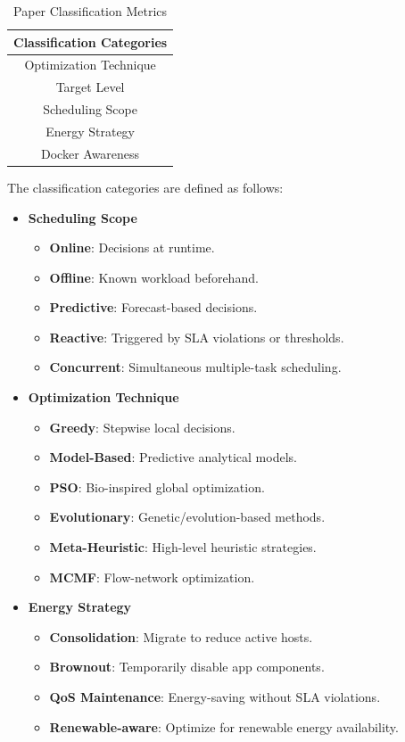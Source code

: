 \begin{multicols}{2}
\begin{table}[H]
\centering
\begin{tabular}{c}
\hline
Classification Categories\\ \hline
Optimization Technique \\ 
Target Level  \\ 
Scheduling Scope \\ 
Energy Strategy \\
Docker Awareness \\
\hline
\end{tabular}
    \caption{Paper Classification Metrics}
    \label{tab:Paper Classification}
\end{table}

The classification categories are defined as follows:

\begin{itemize}
  \item \textbf{Scheduling Scope}
    \begin{itemize}
      \item \textbf{Online}: Decisions at runtime.
      \item \textbf{Offline}: Known workload beforehand.
      \item \textbf{Predictive}: Forecast-based decisions.
      \item \textbf{Reactive}: Triggered by SLA violations or thresholds.
      \item \textbf{Concurrent}: Simultaneous multiple-task scheduling.
    \end{itemize}

  \item \textbf{Optimization Technique}
    \begin{itemize}
      \item \textbf{Greedy}: Stepwise local decisions.
      \item \textbf{Model-Based}: Predictive analytical models.
      \item \textbf{PSO}: Bio-inspired global optimization.
      \item \textbf{Evolutionary}: Genetic/evolution-based methods.
      \item \textbf{Meta-Heuristic}: High-level heuristic strategies.
      \item \textbf{MCMF}: Flow-network optimization.
    \end{itemize}

  \item \textbf{Energy Strategy}
    \begin{itemize}
      \item \textbf{Consolidation}: Migrate to reduce active hosts.
      \item \textbf{Brownout}: Temporarily disable app components.
      \item \textbf{QoS Maintenance}: Energy-saving without SLA violations.
      \item \textbf{Renewable-aware}: Optimize for renewable energy availability.
    \end{itemize}


\end{itemize}
\end{multicols}
